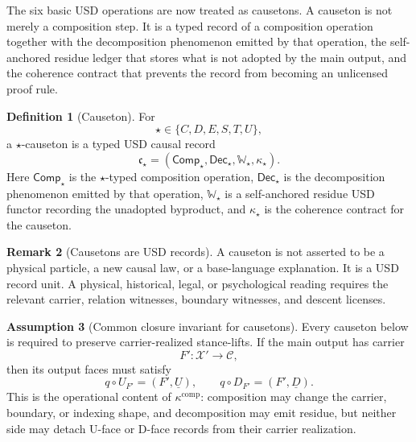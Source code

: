 \documentclass[11pt]{article}
\newcommand{\Comp}{\mathsf{Comp}}
\newcommand{\Dec}{\mathsf{Dec}}
\theoremstyle{definition}
\newtheorem{definition}{Definition}[section]
\newtheorem{remark}[definition]{Remark}
\newtheorem{assumption}[definition]{Assumption}
\theoremstyle{plain}
\begin{document}
The six basic USD operations are now treated as causetons.  A causeton is
not merely a composition step.  It is a typed record of a composition
operation together with the decomposition phenomenon emitted by that
operation, the self-anchored residue ledger that stores what is not
adopted by the main output, and the coherence contract that prevents the
record from becoming an unlicensed proof rule.

\begin{definition}[Causeton]
For
\[
  \star\in\{C,D,E,S,T,U\},
\]
a \(\star\)-causeton is a typed USD causal record
\[
  \mathfrak c_\star
  =
  (\Comp_\star,\Dec_\star,\mathbb W_\star,\kappa_\star).
\]
Here \(\Comp_\star\) is the \(\star\)-typed composition operation,
\(\Dec_\star\) is the decomposition phenomenon emitted by that operation,
\(\mathbb W_\star\) is a self-anchored residue USD functor recording the
unadopted byproduct, and \(\kappa_\star\) is the coherence contract for the
causeton.
\end{definition}

\begin{remark}[Causetons are USD records]
A causeton is not asserted to be a physical particle, a new causal law, or
a base-language explanation.  It is a USD record unit.  A physical,
historical, legal, or psychological reading requires the relevant carrier,
relation witnesses, boundary witnesses, and descent licenses.
\end{remark}

\begin{assumption}[Common closure invariant for causetons]
Every causeton below is required to preserve carrier-realized
stance-lifts.  If the main output has carrier
\[
  F':\mathcal X'\to\mathcal C,
\]
then its output faces must satisfy
\[
  q\circ U_{F'}=(F',\underline U),
  \qquad
  q\circ D_{F'}=(F',\underline D).
\]
This is the operational content of $\kappa^{\mathrm{comp}}$: composition
may change the carrier, boundary, or indexing shape, and decomposition may
emit residue, but neither side may detach U-face or D-face records from
their carrier realization.
\end{assumption}
\end{document}
